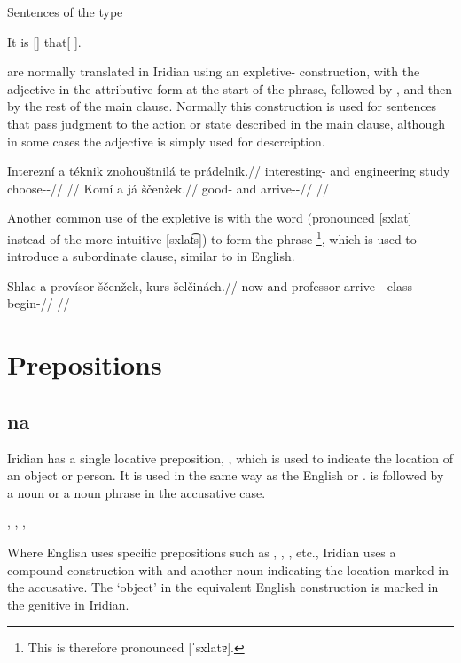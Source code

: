 Sentences of the type

\ex
It is [] that[ ].
\xe

are normally translated in Iridian using an expletive- construction, with the adjective in the attributive form at the start of the phrase, followed by , and then by the rest of the main clause. Normally this construction is used for sentences that pass judgment to the action or state described in the main clause, although in some cases the adjective is simply used for descrciption.

\pex
\begingl
    \gla Interezní a téknik znohouštnilá te prádelnik.//
    \glb interesting-\Att{} and engineering study  choose-\Pv{}-\Pf{}//
    \glft {}//
\endgl
\xe
\pex
\begingl
    \gla Komí a já ščenžek.//
    \glb good-\Att{} and  arrive-\Av{}-\Pf{}//
    \glft {}//
\endgl
\xe

Another common use of the expletive  is with the word  (pronounced [sxlat] instead of the more intuitive [sxlat͡s]) to form the phrase \footnote{This is therefore pronounced [ˈsxlatɐ].}, which is used to introduce a subordinate clause, similar to  in English.

\pex
\begingl
    \gla Shlac a provísor ščenžek, kurs šelčinách.//
    \glb now and professor arrive-\Av{}-\Pf{} class begin-//
    \glft {}//
\endgl
\xe


\section{Prepositions}

\subsection{na}

Iridian has a single locative preposition, , which is used to indicate the location of an object or person. It is used in the same way as the English  or .  is followed by a noun or a noun phrase in the accusative case.

\pex
\a {}, 
\a {}, 
\a {}, 
\xe

Where English uses specific prepositions such as , , , etc., Iridian uses a compound construction with  and another noun indicating the location marked in the accusative. The `object' in the equivalent English construction is marked in the genitive in Iridian.

